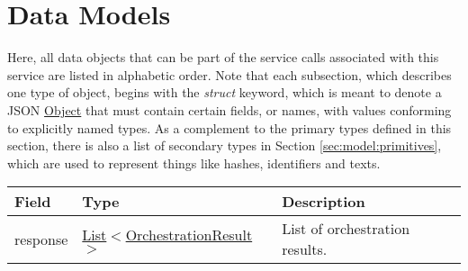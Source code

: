 \documentclass[a4paper]{arrowhead}
\newcommand{\pref}[1]{{\textcolor{ArrowheadGrey}{\hyperref[sec:model:primitives:#1]{#1}}}}
\begin{document}
\newpage

\section{Data Models}
\label{sec:model}

Here, all data objects that can be part of the service calls associated with this service are listed in alphabetic order.
Note that each subsection, which describes one type of object, begins with the \textit{struct} keyword, which is meant to denote a JSON \pref{Object} that must contain certain fields, or names, with values conforming to explicitly named types.
As a complement to the primary types defined in this section, there is also a list of secondary types in Section \ref{sec:model:primitives}, which are used to represent things like hashes, identifiers and texts.

\label{sec:model:OrchestrationResultList}

\begin{table}[ht!]
\begin{tabularx}{\textwidth}{| p{3cm} | p{6cm} | X |} \hline
\rowcolor{gray!33} Field & Type & Description \\ \hline
response & \pref{List}$<$\hyperref[sec:model:OrchestrationResult]{OrchestrationResult}$>$ & List of orchestration results. \\ \hline
\end{tabularx}
\end{table}

\label{sec:model:OrchestrationResult}
\end{document}
